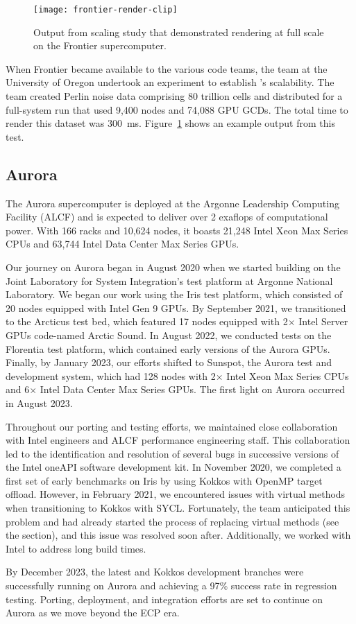 \begin{figure}[htb]
  \texttt{[image: frontier-render-clip]}
  \caption{
    Output from \vtkm scaling study that demonstrated rendering at full scale on the Frontier supercomputer.
  }
  \label{fig:frontier-render}
\end{figure}

When Frontier became available to the various code teams, the \vtkm team at the University of Oregon undertook an experiment to establish \vtkm's scalability.
The team created Perlin noise data comprising 80 trillion cells and distributed for a full-system run that used 9,400 nodes and 74,088 GPU GCDs.
The total time to render this dataset was 300~ms.
Figure~\ref{fig:frontier-render} shows an example output from this test.


\subsection{Aurora}


The Aurora supercomputer is deployed at the Argonne Leadership Computing Facility (ALCF) and is expected to deliver over 2 exaflops of computational power. With 166 racks and 10,624 nodes, it boasts 21,248 Intel Xeon Max Series CPUs and 63,744 Intel Data Center Max Series GPUs.

Our journey on Aurora began in August 2020 when we started building \vtkm on the Joint Laboratory for System Integration's test platform at Argonne National Laboratory.
We began our work using the Iris test platform, which consisted of 20 nodes equipped with Intel Gen 9 GPUs.
By September 2021, we transitioned to the Arcticus test bed, which featured 17 nodes equipped with 2$\times$ Intel Server GPUs code-named Arctic Sound.
In August 2022, we conducted tests on the Florentia test platform, which contained early versions of the Aurora GPUs.
Finally, by January 2023, our efforts shifted to Sunspot, the Aurora test and development system, which had 128 nodes with 2$\times$ Intel Xeon Max Series CPUs and 6$\times$ Intel Data Center Max Series GPUs.
The first light on Aurora occurred in August 2023.

Throughout our porting and testing efforts, we maintained close collaboration with Intel engineers and ALCF performance engineering staff. This collaboration led to the identification and resolution of several bugs in successive versions of the Intel oneAPI software development kit. In November 2020, we completed a first set of early \vtkm benchmarks on Iris by using Kokkos with OpenMP target offload. However, in February 2021, we encountered issues with virtual methods when transitioning to Kokkos with SYCL. Fortunately, the team anticipated this problem and had already started the process of replacing virtual methods (see the  section), and this issue was resolved soon after. Additionally, we worked with Intel to address long build times.

By December 2023, the latest \vtkm and Kokkos development branches were successfully running on Aurora and achieving a 97\% success rate in regression testing. Porting, deployment, and integration efforts are set to continue on Aurora as we move beyond the ECP era.
